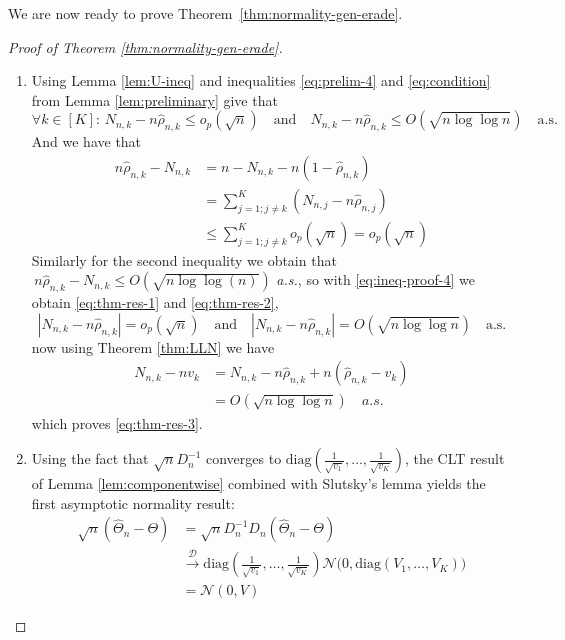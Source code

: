 \documentclass[11pt]{article}
\theoremstyle{plain}
\theoremstyle{definition}
\begin{document}
\begin{appendix}
We are now ready to prove Theorem~\ref{thm:normality-gen-erade}.

\begin{proof}[Proof of Theorem \ref{thm:normality-gen-erade}]
	\begin{enumerate}[label=(\roman*)]
		\item Using Lemma \ref{lem:U-ineq} and inequalities \eqref{eq:prelim-4} and \eqref{eq:condition} from Lemma \ref{lem:preliminary} give that	
		\begin{equation}\label{eq:ineq-proof-4}
			\forall k \in [K]: \, N_{n,k} - n\hat{\rho}_{n,k} \leq o_p(\sqrt{n}) \quad \text{and} \quad N_{n,k} - n\hat{\rho}_{n,k} \leq O(\sqrt{n \log \log n}) \quad \text{a.s.}
		\end{equation}
		And we have that 
		\begin{align*}
			n\hat{\rho}_{n,k} - N_{n,k} &= n - N_{n,k} - n (1 - \hat{\rho}_{n,k})\\
			&= \sum_{j=1; j\neq k}^{K} \left(N_{n,j} - n \hat\rho_{n,j}\right)\\
			&\leq \sum_{j=1; j\neq k}^{K} o_p(\sqrt{n}) = o_p(\sqrt{n}) 
		\end{align*}
		Similarly for the second inequality we obtain that
		 \(\,n\hat{\rho}_{n,k} - N_{n,k} \leq O\left(\!\sqrt{n \log\!\log(n)}\right)\) \textit{a.s.}, so with \eqref{eq:ineq-proof-4} we obtain \eqref{eq:thm-res-1} and \eqref{eq:thm-res-2},
		\[
		|N_{n,k} - n\hat{\rho}_{n,k}| = o_p(\sqrt{n}) \quad \text{and} \quad  |N_{n,k} - n\hat{\rho}_{n,k}| = O(\sqrt{n \log\!\log n}) \quad \text{a.s.}
		\]
		now using Theorem \ref{thm:LLN} we have
		\begin{align*}
			N_{n,k} - n v_k &= N_{n,k} - n \hat{\rho}_{n,k} + n(\hat{\rho}_{n,k} - v_k)\\
			&= O(\sqrt{n \log \log n}) \quad a.s.
		\end{align*}
		which proves \eqref{eq:thm-res-3}.

		\item Using the fact that \(\sqrt n D_n^{-1}\) converges to \(\mathrm{diag}\left(\frac{1}{\sqrt{v_1}},\ldots,\frac{1}{\sqrt{v_K}}\right)\), the CLT result of Lemma \ref{lem:componentwise} combined with Slutsky's lemma yields the first asymptotic normality result:
		\begin{align*}
			\sqrt n(\hat\Theta_n-\Theta) &= \sqrt n D_n^{-1} D_n(\hat\Theta_n-\Theta)\\
			&\xrightarrow{\mathcal{D}}\mathrm{diag}\left(\frac{1}{\sqrt{v_1}},\ldots,\frac{1}{\sqrt{v_K}}\right) \mathcal N\!\big(0,\mathrm{diag}\left(V_1,\dots,V_K\right)\big)\\
			&= \mathcal N(0,V) 
		\end{align*}
		

\end{enumerate}
\end{proof}
\end{appendix}
\end{document}
